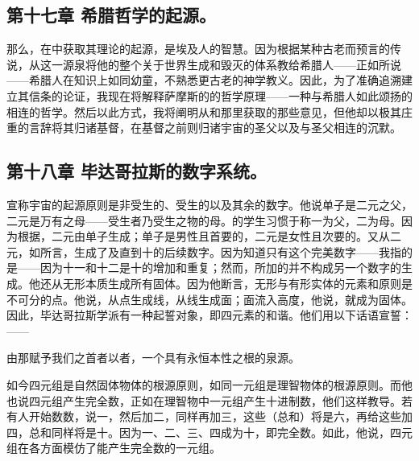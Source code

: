 
\subsection{第十七章 希腊哲学的起源。}

那么，在中获取其理论的起源，是埃及人的智慧。因为根据某种古老而预言的传说，从这一源泉将他的整个关于世界生成和毁灭的体系教给希腊人——正如所说——希腊人在知识上如同幼童，不熟悉更古老的神学教义。因此，为了准确追溯建立其信条的论证，我现在将解释萨摩斯的的哲学原理——一种与希腊人如此颂扬的相连的哲学。然后以此方式，我将阐明从和那里获取的那些意见，但他却以极其庄重的言辞将其归诸基督，在基督之前则归诸宇宙的圣父以及与圣父相连的沉默。\par


\subsection{第十八章 毕达哥拉斯的数字系统。}

宣称宇宙的起源原则是非受生的、受生的以及其余的数字。他说单子是二元之父，二元是万有之母——受生者乃受生之物的母。的学生习惯于称一为父，二为母。因为根据，二元由单子生成；单子是男性且首要的，二元是女性且次要的。又从二元，如所言，生成了及直到十的后续数字。因为知道只有这个完美数字——我指的是——因为十一和十二是十的增加和重复；然而，所加的并不构成另一个数字的生成。他还从无形本质生成所有固体。因为他断言，无形与有形实体的元素和原则是不可分的点。他说，从点生成线，从线生成面；面流入高度，他说，就成为固体。因此，毕达哥拉斯学派有一种起誓对象，即四元素的和谐。他们用以下话语宣誓：——\par

由那赋予我们之首者以者，\newline{}一个具有永恒本性之根的泉源。\par

如今四元组是自然固体物体的根源原则，如同一元组是理智物体的根源原则。而他也说四元组产生完全数，正如在理智物中一元组产生十进制数，他们这样教导。若有人开始数数，说一，然后加二，同样再加三，这些（总和）将是六，再给这些加四，总和同样将是十。因为一、二、三、四成为十，即完全数。如此，他说，四元组在各方面模仿了能产生完全数的一元组。\par

